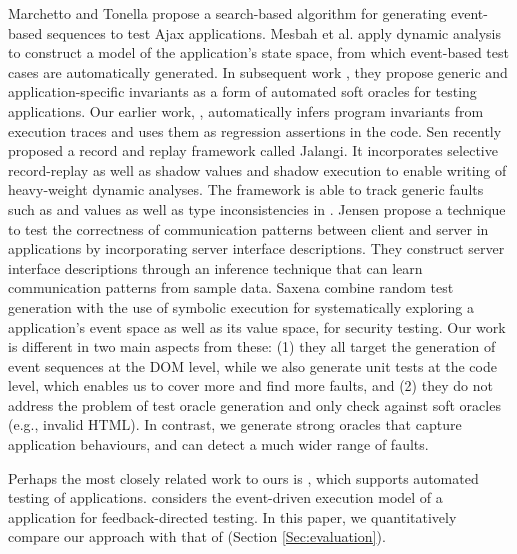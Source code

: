 Marchetto and Tonella \cite{marchetto:search} propose a search-based algorithm for generating event-based sequences to test Ajax applications. 
Mesbah et al.  \cite{mesbah:tweb11} apply dynamic analysis to construct a model of the application's state space, from which event-based test cases are automatically generated. In subsequent work \cite{mesbah:tse12}, they propose generic and application-specific invariants as a form of automated soft oracles for testing \ajax applications.  Our earlier work, \jsart \cite{mirshokraie:icwe12}, automatically infers program invariants from \javascript execution traces and uses them as regression assertions in the code. 
Sen \etal \cite{sen:fse13} recently proposed a record and replay framework called Jalangi. It incorporates selective record-replay as well as shadow values and shadow execution to enable writing of heavy-weight dynamic analyses.
The framework is able to track generic faults such as  and  values as well as type inconsistencies in \javascript. 
Jensen \etal \cite{jensen:fse13} propose a technique to test the correctness of communication patterns between client and server in \ajax applications by incorporating server interface descriptions.
They construct server interface descriptions through an inference technique that can learn communication patterns from sample data.
Saxena \etal \cite{song:symb10} combine random test generation with the use of symbolic execution for systematically exploring a \javascript application's event space as well as its value space, for security testing.
Our work is different in two main aspects from these: (1) they all target the generation of event sequences at the DOM level, while we also generate unit tests at the \javascript code level, which enables us to cover more and find more faults,
and (2) they do not address the problem of test oracle generation and only check against soft oracles (e.g., invalid HTML). In contrast, we generate strong oracles that capture
application behaviours, and can detect a much wider range of faults.

Perhaps the most closely related work to ours is \artemis \cite{artzi:icse11}, which supports automated testing of \javascript applications.
\artemis considers the event-driven execution model of a \javascript application for feedback-directed testing.
In this paper, we quantitatively compare our approach with that of \artemis (Section \ref{Sec:evaluation}).

